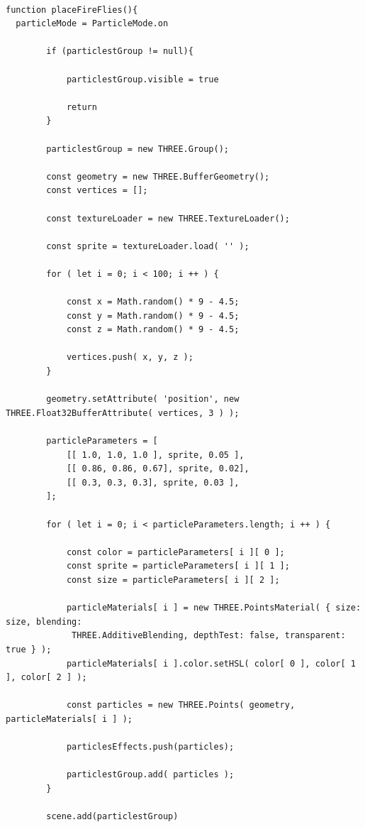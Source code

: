 \documentclass[10pt,a4paper]{article}
\begin{document}
\begin{verbatim}

function placeFireFlies(){
  particleMode = ParticleMode.on
        
        if (particlestGroup != null){

            particlestGroup.visible = true

            return
        }

        particlestGroup = new THREE.Group();

        const geometry = new THREE.BufferGeometry();
        const vertices = [];

        const textureLoader = new THREE.TextureLoader();

        const sprite = textureLoader.load( '' );

        for ( let i = 0; i < 100; i ++ ) {

            const x = Math.random() * 9 - 4.5;
            const y = Math.random() * 9 - 4.5;
            const z = Math.random() * 9 - 4.5;

            vertices.push( x, y, z );
        }

        geometry.setAttribute( 'position', new THREE.Float32BufferAttribute( vertices, 3 ) );

        particleParameters = [
            [[ 1.0, 1.0, 1.0 ], sprite, 0.05 ],
            [[ 0.86, 0.86, 0.67], sprite, 0.02],
            [[ 0.3, 0.3, 0.3], sprite, 0.03 ],
        ];

        for ( let i = 0; i < particleParameters.length; i ++ ) {

            const color = particleParameters[ i ][ 0 ];
            const sprite = particleParameters[ i ][ 1 ];
            const size = particleParameters[ i ][ 2 ];

            particleMaterials[ i ] = new THREE.PointsMaterial( { size: size, blending:
             THREE.AdditiveBlending, depthTest: false, transparent: true } );
            particleMaterials[ i ].color.setHSL( color[ 0 ], color[ 1 ], color[ 2 ] );

            const particles = new THREE.Points( geometry, particleMaterials[ i ] );

            particlesEffects.push(particles);

            particlestGroup.add( particles );
        }

        scene.add(particlestGroup)
\end{verbatim}
\end{document}
